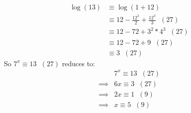 \documentclass[11pt]{article}
\begin{document}
\begin{align*}
	\log(13) &\equiv \log(1+12) \\[0.5em]
	&\equiv 12-\frac{12^2}{2} + \frac{12^3}{3} \hspace{7pt} (27)\\[0.5em]
	&\equiv 12-72 + 3^2 * 4^3 \hspace{7pt} (27)\\[0.5em]
	&\equiv 12 -72 + 9 \hspace{7pt} (27)\\[0.5em]
	&\equiv 3\hspace{7pt} (27)
\end{align*}
So $7^x \equiv 13 \hspace{7pt} (27) $ reduces to:
\begin{align*}
	& 7^x \equiv 13 \hspace{7pt} (27) \\
	\implies &6x \equiv 3 \hspace{7pt} (27)\\
	\implies &2x \equiv 1 \hspace{7pt} (9)\\
	\implies &x \equiv 5 \hspace{7pt} (9)
\end{align*}
\newpage
\end{document}
